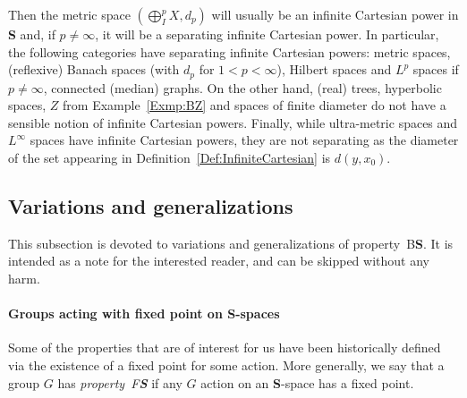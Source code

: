 \documentclass[a4paper]{article}
\theoremstyle{definition}
\newtheorem{rem}[lem]{Remark}
\newcommand*{\category}[1]{\textbf{#1}}
\newcommand*{\PMet}{\category{PMet}}
\newcommand*{\CatS}{\category{S}}
\newcommand*{\BS}{B\textbf{S}}
\newcommand*{\FS}{F\textbf{S}}
\begin{document}
Then the metric space $(\bigoplus^p_IX,d_p)$ will usually be an infinite Cartesian power in \CatS{} and, if $p\neq\infty$, it will be a separating infinite Cartesian power.
In particular, the following categories have separating infinite  Cartesian powers: metric spaces, (reflexive) Banach spaces (with $d_p$ for $1<p<\infty$), Hilbert spaces and $L^p$ spaces if $p\neq\infty$, connected (median) graphs.
On the other hand, (real) trees, hyperbolic spaces, $Z$ from Example~\ref{Exmp:BZ} and spaces of finite diameter do not have a sensible notion of infinite Cartesian powers. Finally, while ultra-metric spaces and $L^\infty$ spaces have infinite Cartesian powers, they are not separating as the diameter of the set appearing in Definition~\ref{Def:InfiniteCartesian} is $d(y,x_0)$.
%
%
%
\subsection{Variations and generalizations}
This subsection is devoted to variations and generalizations of property~\BS.
It is intended as a note for the interested reader, and can be skipped without any harm.
%
%
%
%
%
\paragraph{Groups acting with fixed point on \CatS-spaces}
Some of the properties that are of interest for us have been historically defined via the existence of a fixed point for some action.
More generally, we say that a group $G$ has \emph{property~\FS} if any $G$ action on an \CatS-space has a fixed point.
\end{document}
